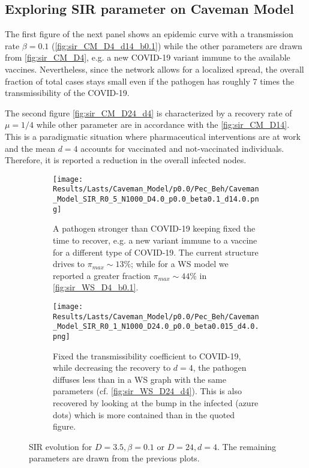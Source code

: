 \documentclass[a4paper,10pt,twoside]{book} %
\theoremstyle{definition}
\begin{document}
\clearpage
\subsection*{Exploring SIR parameter on Caveman Model}
The first figure of the next panel shows an epidemic curve with a transmission rate $\beta = 0.1$ (\autoref{fig:sir_CM_D4_d14_b0.1}) while the other parameters are drawn from \autoref{fig:sir_CM_D4}, e.g. a new COVID-19 variant immune to the available vaccines. Nevertheless, since the network allows for a localized spread, the overall fraction of total cases stays small even if the pathogen has roughly $7$ times the transmissibility of the COVID-19.

The second figure \autoref{fig:sir_CM_D24_d4} is characterized by a recovery rate of $ \mu = 1/4$ while other parameter are in accordance with the \autoref{fig:sir_CM_D14}. This is a paradigmatic situation where pharmaceutical interventions are at work and the mean $ d = 4$ accounts for vaccinated and not-vaccinated individuals. Therefore, it is reported a reduction in the overall infected nodes.

\begin{figure}[htbp]
	\centering
	\begin{subfigure}{0.8\linewidth}
		\texttt{[image: Results/Lasts/Caveman\_Model/p0.0/Pec\_Beh/Caveman\_Model\_SIR\_R0\_5\_N1000\_D4.0\_p0.0\_beta0.1\_d14.0.png]}
		\caption{A pathogen stronger than COVID-19 keeping fixed the time to recover, e.g. a new variant immune to a vaccine for a different type of COVID-19. The current structure drives to $ \pi_{max} \sim 13\%$; while for a WS model we reported a greater fraction $ \pi_{max} \sim 44\%$ in \autoref{fig:sir_WS_D4_b0.1}.}
		\label{fig:sir_CM_D4_d14_b0.1}
	\end{subfigure}
	\par\bigskip
	\centering
	\begin{subfigure}{0.8\linewidth}
		\texttt{[image: Results/Lasts/Caveman\_Model/p0.0/Pec\_Beh/Caveman\_Model\_SIR\_R0\_1\_N1000\_D24.0\_p0.0\_beta0.015\_d4.0.png]}
		\caption{Fixed the transmissibility coefficient to COVID-19, while decreasing the recovery to $d = 4$, the pathogen diffuses less than in a WS graph with the same parameters (cf. \autoref{fig:sir_WS_D24_d4}). This is also recovered by looking at the bump in the infected (azure dots) which is more contained than in the quoted figure.}
		\label{fig:sir_CM_D24_d4}
	\end{subfigure}
	\caption{SIR evolution for $D = 3.5, \beta = 0.1$ or $ D=24,d=4$. The remaining parameters are drawn from the previous plots.}
	\label{fig:sir_CMD4b0.1_D14d4}
\end{figure}
\end{document}
